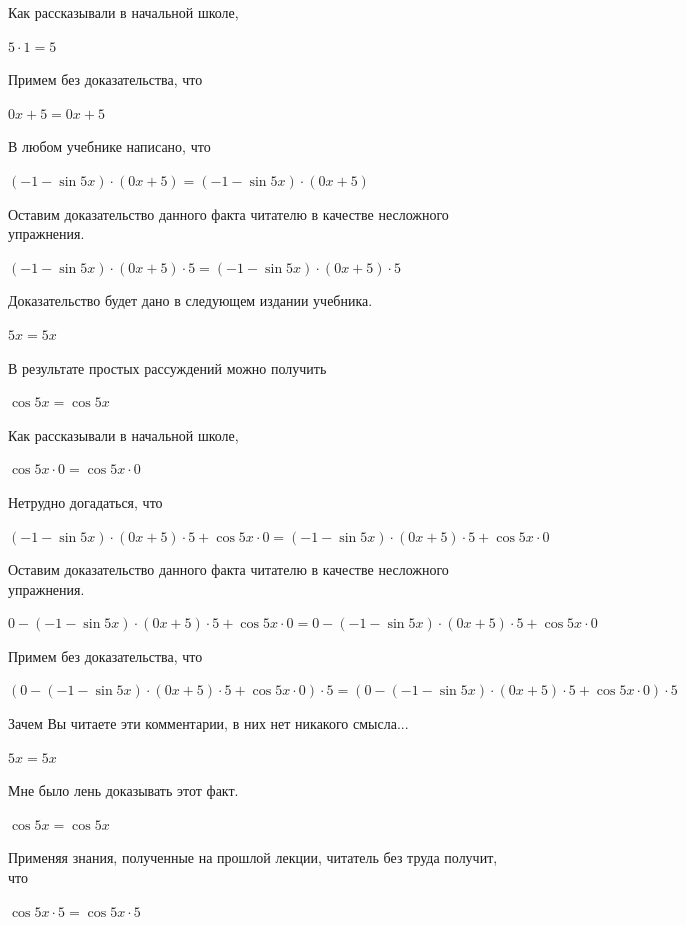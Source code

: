 \documentclass[12pt,a4paper,fleqn]{article}
\theoremstyle{definition}
\begin{document}
Как рассказывали в начальной школе, 

$ 5  \cdot  1  =  5 $

Примем без доказательства, что 

$ 0  x  +  5  =  0  x  +  5 $

В любом учебнике написано, что 

$( -1  - \sin 5  x ) \cdot ( 0  x  +  5 ) = ( -1  - \sin 5  x ) \cdot ( 0  x  +  5 )$

Оставим доказательство данного факта читателю в качестве несложного упражнения. 

$( -1  - \sin 5  x ) \cdot ( 0  x  +  5 ) \cdot  5  = ( -1  - \sin 5  x ) \cdot ( 0  x  +  5 ) \cdot  5 $

Доказательство будет дано в следующем издании учебника. 

$ 5  x  =  5  x $

В результате простых рассуждений можно получить 

$\cos 5  x  = \cos 5  x $

Как рассказывали в начальной школе, 

$\cos 5  x  \cdot  0  = \cos 5  x  \cdot  0 $

Нетрудно догадаться, что 

$( -1  - \sin 5  x ) \cdot ( 0  x  +  5 ) \cdot  5  + \cos 5  x  \cdot  0  = ( -1  - \sin 5  x ) \cdot ( 0  x  +  5 ) \cdot  5  + \cos 5  x  \cdot  0 $

Оставим доказательство данного факта читателю в качестве несложного упражнения. 

$ 0  - ( -1  - \sin 5  x ) \cdot ( 0  x  +  5 ) \cdot  5  + \cos 5  x  \cdot  0  =  0  - ( -1  - \sin 5  x ) \cdot ( 0  x  +  5 ) \cdot  5  + \cos 5  x  \cdot  0 $

Примем без доказательства, что 

$( 0  - ( -1  - \sin 5  x ) \cdot ( 0  x  +  5 ) \cdot  5  + \cos 5  x  \cdot  0 ) \cdot  5  = ( 0  - ( -1  - \sin 5  x ) \cdot ( 0  x  +  5 ) \cdot  5  + \cos 5  x  \cdot  0 ) \cdot  5 $

Зачем Вы читаете эти комментарии, в них нет никакого смысла... 

$ 5  x  =  5  x $

Мне было лень доказывать этот факт.

$\cos 5  x  = \cos 5  x $

Применяя знания, полученные на прошлой лекции, читатель без труда получит, что 

$\cos 5  x  \cdot  5  = \cos 5  x  \cdot  5 $
\end{document}
